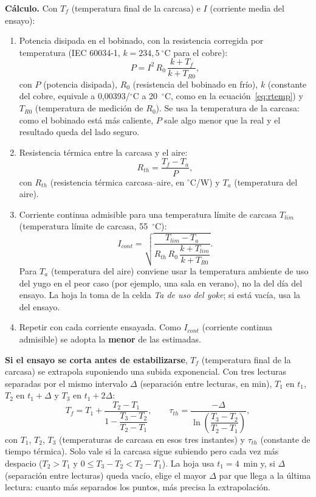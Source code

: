 \documentclass[11pt,a4paper]{article}
\begin{document}
\textbf{Cálculo.} Con $T_f$ (temperatura final de la carcasa) e $I$ (corriente media del ensayo):
\begin{enumerate}
\item Potencia disipada en el bobinado, con la resistencia corregida por temperatura (IEC 60034-1, $k = 234{,}5~^\circ$C para el cobre):
\[
P = I^2\,R_0\,\frac{k + T_f}{k + T_{R0}},
\]
con $P$ (potencia disipada), $R_0$ (resistencia del bobinado en frío), $k$ (constante del cobre, equivale a 0,00393/$^\circ$C a 20~$^\circ$C, como en la ecuación~\eqref{eq:rtemp}) y $T_{R0}$ (temperatura de medición de $R_0$). Se usa la temperatura de la carcasa: como el bobinado está más caliente, $P$ sale algo menor que la real y el resultado queda del lado seguro.
\item Resistencia térmica entre la carcasa y el aire:
\[
R_{th} = \frac{T_f - T_a}{P},
\]
con $R_{th}$ (resistencia térmica carcasa--aire, en $^\circ$C/W) y $T_a$ (temperatura del aire).
\item Corriente continua admisible para una temperatura límite de carcasa $T_{lim}$ (temperatura límite de carcasa, 55~$^\circ$C):
\[
I_{cont} = \sqrt{\frac{T_{lim} - T_a}{R_{th}\,R_0\,\dfrac{k + T_{lim}}{k + T_{R0}}}}.
\]
Para $T_a$ (temperatura del aire) conviene usar la temperatura ambiente de uso del yugo en el peor caso (por ejemplo, una sala en verano), no la del día del ensayo. La hoja la toma de la celda \emph{Ta de uso del yoke}; si está vacía, usa la del ensayo.
\item Repetir con cada corriente ensayada. Como $I_{cont}$ (corriente continua admisible) se adopta la \textbf{menor} de las estimadas.
\end{enumerate}

\textbf{Si el ensayo se corta antes de estabilizarse}, $T_f$ (temperatura final de la carcasa) se extrapola suponiendo una subida exponencial. Con tres lecturas separadas por el mismo intervalo $\Delta$ (separación entre lecturas, en min), $T_1$ en $t_1$, $T_2$ en $t_1 + \Delta$ y $T_3$ en $t_1 + 2\Delta$:
\[
T_f = T_1 + \frac{T_2 - T_1}{1 - \dfrac{T_3 - T_2}{T_2 - T_1}},
\qquad
\tau_{th} = \frac{-\Delta}{\ln\!\left(\dfrac{T_3 - T_2}{T_2 - T_1}\right)},
\]
con $T_1$, $T_2$, $T_3$ (temperaturas de carcasa en esos tres instantes) y $\tau_{th}$ (constante de tiempo térmica). Solo vale si la carcasa sigue subiendo pero cada vez más despacio ($T_2 > T_1$ y $0 \le T_3 - T_2 < T_2 - T_1$). La hoja usa $t_1 = 4$~min y, si $\Delta$ (separación entre lecturas) queda vacío, elige el mayor $\Delta$ par que llega a la última lectura: cuanto más separados los puntos, más precisa la extrapolación.
\end{document}
